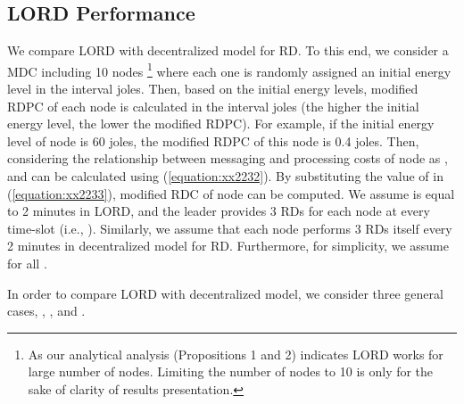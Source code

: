 \documentclass[journal,12pt, onecolumn]{IEEEtran}
\begin{document}
\subsection{LORD Performance}
We compare LORD with decentralized model for RD. To this end, we consider a MDC including 10 nodes \footnote[1]{As our analytical analysis (Propositions 1 and 2) indicates LORD works for large number of nodes. Limiting the number of nodes to 10 is only for the sake of clarity of results presentation.} where each one is randomly assigned an initial energy level in the interval  joles. Then, based on the initial energy levels, modified RDPC of each node is calculated in the interval  joles (the higher the initial energy level, the lower the modified RDPC). For example, if the initial energy level of node  is 60 joles, the modified RDPC of this node is 0.4 joles. Then, considering the relationship between messaging and processing costs of node  as ,  and  can be calculated using (\ref{equation:xx2232}). By substituting the value of  in (\ref{equation:xx2233}), modified RDC of node  can be computed. 
We assume  is equal to 2 minutes in LORD, and the leader provides 3 RDs for each node at every time-slot (i.e., ). Similarly, we assume that each node performs 3 RDs itself every 2 minutes in decentralized model for RD. Furthermore, for simplicity, we assume  for all . 


In order to compare LORD with decentralized model, we consider three general cases, , , and .
\end{document}

